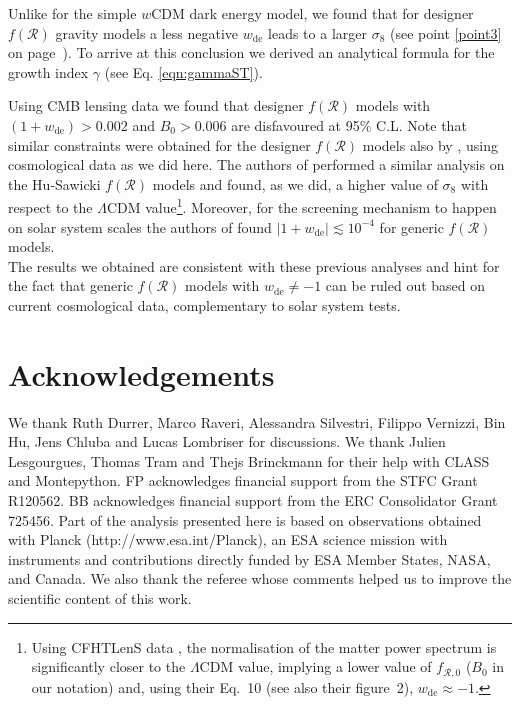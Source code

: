 \documentclass[nofootinbib,a4paper,aps,prd,10pt,superscriptaddress,reprint,showkeys,showpacs]{revtex4-1}
\newcommand{\qsubrm}[2]{{#1}_{\scriptscriptstyle{\textrm{#2}}}}
\begin{document}
Unlike for the simple $w$CDM dark energy model, we found that for designer $f(\mathcal{R})$ gravity models a less 
negative $\qsubrm{w}{de}$ leads to a larger $\qsubrm{\sigma}{8}$ (see point \ref{point3} on page~\pageref{point3}). To 
arrive at this conclusion we derived an analytical formula for the growth index $\gamma$ (see Eq. \eqref{eqn:gammaST}).

Using CMB lensing data we found that designer $f(\mathcal{R})$ models with $(1+\qsubrm{w}{de})>0.002$ and 
$\qsubrm{B}{0}>0.006$ are disfavoured at 95\% C.L. Note that similar constraints were obtained for the designer 
$f(\mathcal{R})$ models also by \cite{Raveri2014}, using cosmological data as we did here. 
The authors of \cite{Hu2016} performed a similar analysis on the Hu-Sawicki $f(\mathcal{R})$ models and found, as we 
did, a higher value of $\qsubrm{\sigma}{8}$ with respect to the $\Lambda$CDM value\footnote{Using CFHTLenS data 
\citep{Heymans2013}, the normalisation of the matter power spectrum is significantly closer to the $\Lambda$CDM value, 
implying a lower value of $f_{\mathcal{R},0}$ ($\qsubrm{B}{0}$ in our notation) and, using their Eq.~10 (see also their 
figure~2), $\qsubrm{w}{de}\approx -1$.}. Moreover, for the screening mechanism to happen on solar system scales the 
authors of \citep{Brax2008,Faulkner2007} found $|1+\qsubrm{w}{de}|\lesssim 10^{-4}$ for generic $f(\mathcal{R})$ 
models.\\

The results we obtained are consistent with these previous analyses and hint for the fact that generic $f(\mathcal{R})$ 
models with $\qsubrm{w}{de}\neq-1$ can be ruled out based on current cosmological data, complementary to solar system 
tests.


\section{Acknowledgements}
We thank Ruth Durrer, Marco Raveri, Alessandra Silvestri, Filippo Vernizzi, Bin Hu, Jens Chluba and Lucas Lombriser for 
discussions. We thank Julien Lesgourgues, Thomas Tram and Thejs Brinckmann for their help with CLASS and Montepython. 
FP acknowledges financial support from the STFC Grant R120562. BB acknowledges financial support from the ERC 
Consolidator Grant 725456. Part of the analysis presented here is based on observations obtained with Planck 
(http://www.esa.int/Planck), an ESA science mission with instruments and contributions directly funded by ESA Member 
States, NASA, and Canada. We also thank the referee whose comments helped us to improve the scientific content of 
this work.
\end{document}

